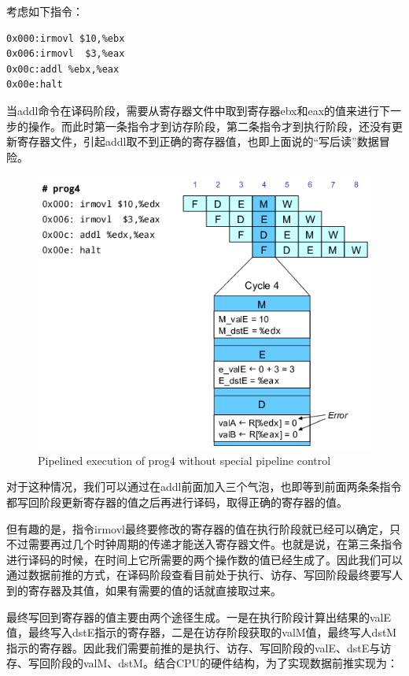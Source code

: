 考虑如下指令：

\begin{verbatim}
0x000:irmovl $10,%ebx
0x006:irmovl  $3,%eax
0x00c:addl %ebx,%eax
0x00e:halt
\end{verbatim}

当addl命令在译码阶段，需要从寄存器文件中取到寄存器ebx和eax的值来进行下一步的操作。而此时第一条指令才到访存阶段，第二条指令才到执行阶段，还没有更新寄存器文件，引起addl取不到正确的寄存器值，也即上面说的``写后读''数据冒险。

\begin{figure}[htbp]
\centering
\includegraphics{img/prog4-uncontrol.png}
\caption{Pipelined execution of prog4 without special pipeline control}
\end{figure}

对于这种情况，我们可以通过在addl前面加入三个气泡，也即等到前面两条条指令都写回阶段更新寄存器的值之后再进行译码，取得正确的寄存器的值。

但有趣的是，指令irmovl最终要修改的寄存器的值在执行阶段就已经可以确定，只不过需要再过几个时钟周期的传递才能送入寄存器文件。也就是说，在第三条指令进行译码的时候，在时间上它所需要的两个操作数的值已经生成了。因此我们可以通过数据前推的方式，在译码阶段查看目前处于执行、访存、写回阶段最终要写人到的寄存器及其值，如果有需要的值的话就直接取过来。

最终写回到寄存器的值主要由两个途径生成。一是在执行阶段计算出结果的valE值，最终写入dstE指示的寄存器，二是在访存阶段获取的valM值，最终写人dstM指示的寄存器。因此我们需要前推的是执行、访存、写回阶段的valE、dstE与访存、写回阶段的valM、dstM。结合CPU的硬件结构，为了实现数据前推实现为：

